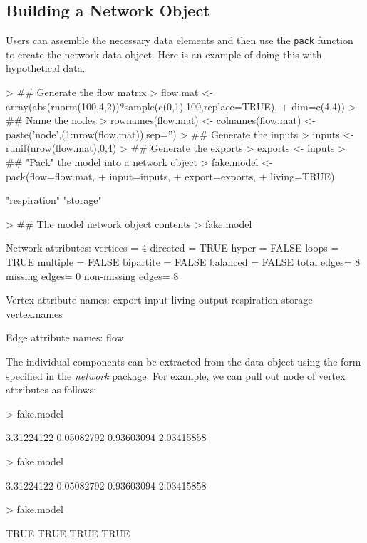 \documentclass[article]{jss}
\begin{document}
\subsection{Building a Network Object}

Users can assemble the necessary data elements and then use the
\texttt{pack} function to create the network data object.  Here is an
example of doing this with hypothetical data.

\begin{Schunk}
\begin{Sinput}
> ## Generate the flow matrix
> flow.mat <- array(abs(rnorm(100,4,2))*sample(c(0,1),100,replace=TRUE),
+                    dim=c(4,4))
> ## Name the nodes
> rownames(flow.mat) <- colnames(flow.mat) <- paste('node',(1:nrow(flow.mat)),sep='')
> ## Generate the inputs
> inputs <- runif(nrow(flow.mat),0,4)
> ## Generate the exports
> exports <- inputs
> ## "Pack" the model into a network object
> fake.model <- pack(flow=flow.mat,
+                     input=inputs,
+                     export=exports,
+                     living=TRUE)
\end{Sinput}
\begin{Soutput}
[1] "respiration" "storage"    
\end{Soutput}
\begin{Sinput}
> ## The model network object contents
> fake.model
\end{Sinput}
\begin{Soutput}
 Network attributes:
  vertices = 4 
  directed = TRUE 
  hyper = FALSE 
  loops = TRUE 
  multiple = FALSE 
  bipartite = FALSE 
  balanced = FALSE 
  total edges= 8 
    missing edges= 0 
    non-missing edges= 8 

 Vertex attribute names: 
    export input living output respiration storage vertex.names 

 Edge attribute names: 
    flow 
\end{Soutput}
\end{Schunk}

The individual components can be extracted from the data object using
the form specified in the \textit{network} package.  For example, we
can pull out node of vertex attributes as follows:

\begin{Schunk}
\begin{Sinput}
> fake.model%
\end{Sinput}
\begin{Soutput}
[1] 3.31224122 0.05082792 0.93603094 2.03415858
\end{Soutput}
\begin{Sinput}
> fake.model%
\end{Sinput}
\begin{Soutput}
[1] 3.31224122 0.05082792 0.93603094 2.03415858
\end{Soutput}
\begin{Sinput}
> fake.model%
\end{Sinput}
\begin{Soutput}
[1] TRUE TRUE TRUE TRUE
\end{Soutput}
\end{Schunk}
\end{document}
